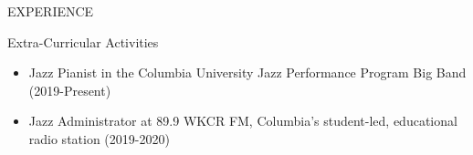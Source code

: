 \documentclass{resume} %
\begin{document}
\begin{rSection}{EXPERIENCE}
		
	\end{rSection} 
	
	
	
	\begin{rSection}{Extra-Curricular Activities} 
		\begin{itemize}
			\itemsep -3pt {} 
			\item Jazz Pianist in the Columbia University Jazz Performance Program Big Band (2019-Present)
			\item	Jazz Administrator at 89.9 WKCR FM, Columbia’s student-led, educational radio station (2019-2020)
		\end{itemize}
		
		
	\end{rSection}
	
	
	
\end{document}
